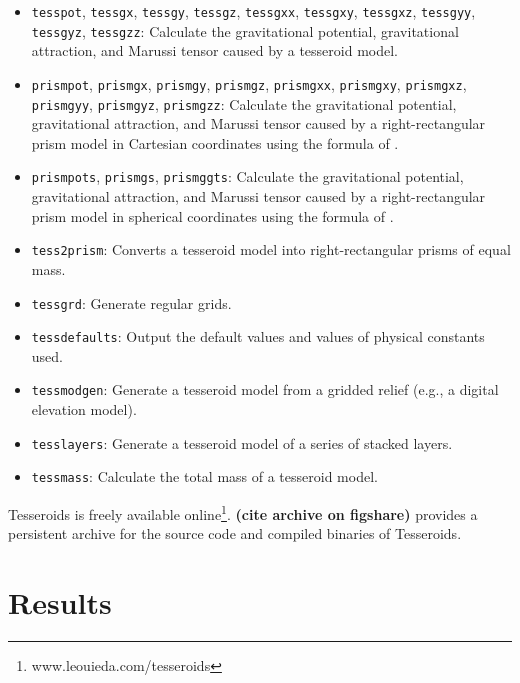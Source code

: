 \documentclass[paper,twocolumn,twoside]{geophysics}
\begin{document}
\begin{itemize}
    \item \texttt{tesspot}, \texttt{tessgx}, \texttt{tessgy}, \texttt{tessgz},
        \texttt{tessgxx}, \texttt{tessgxy}, \texttt{tessgxz},
        \texttt{tessgyy}, \texttt{tessgyz}, \texttt{tessgzz}:
        Calculate the gravitational potential, gravitational attraction,
        and Marussi tensor caused by a tesseroid model.
    \item \texttt{prismpot},
        \texttt{prismgx}, \texttt{prismgy}, \texttt{prismgz},
        \texttt{prismgxx}, \texttt{prismgxy}, \texttt{prismgxz},
        \texttt{prismgyy}, \texttt{prismgyz}, \texttt{prismgzz}:
        Calculate the gravitational potential, gravitational attraction,
        and Marussi tensor caused by a right-rectangular prism model
        in Cartesian coordinates
        using the formula of \citet{Nagy2000}.
    \item \texttt{prismpots}, \texttt{prismgs}, \texttt{prismggts}:
        Calculate the gravitational potential, gravitational attraction,
        and Marussi tensor caused by a right-rectangular prism model
        in spherical coordinates
        using the formula of \citet{Wild-Pfeiffer2008}.
    \item \texttt{tess2prism}: Converts a tesseroid model into
        right-rectangular prisms of equal mass.
    \item \texttt{tessgrd}: Generate regular grids.
    \item \texttt{tessdefaults}: Output the default values
        and values of physical constants used.
    \item \texttt{tessmodgen}: Generate a tesseroid model
        from a gridded relief (e.g., a digital elevation model).
    \item \texttt{tesslayers}: Generate a tesseroid model of
        a series of stacked layers.
    \item \texttt{tessmass}: Calculate the total mass of a tesseroid model.
\end{itemize}

Tesseroids is freely available
online\footnote{www.leouieda.com/tesseroids}.
\textbf{(cite archive on figshare)} provides a persistent
archive for the source code and compiled binaries of Tesseroids.


\section{Results}
\end{document}

